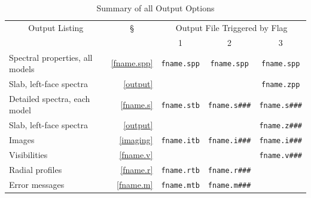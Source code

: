 \documentclass[11pt]{article}
\let\q=\qquad
\begin{document}
\begin{appendix}
\begin{table}[htbp]
\begin{center}
\caption{\hfil Summary of all Output Options}\label{Options Table}
\centerline{}
\renewcommand{\arraystretch}{1.3}
\begin{tabular}{|l|r||c|c|c|}                              \hline
 \multicolumn{1}{|c|}{Output Listing}  &
 \multicolumn{1}{c||}{\S}     &
 \multicolumn{3}{|c|}{Output File Triggered by Flag}  \\ \cline{3-5}
                  & & 1 & 2 & 3 \\ \hline
Spectral properties, all models  & \ref{fname.spp}
                                 & {\tt fname.spp}
                                 & {\tt fname.spp}
                                 & {\tt fname.spp}
                                 \\ \cline{1-2} \cline{5-5}
\q Slab, left-face spectra       & \ref{output}
                                 & & & {\tt fname.zpp}
                                 \\ \hline
Detailed spectra, each model     & \ref{fname.s}
                                 & {\tt fname.stb}
                                 & {\tt fname.s\#\#\#}
                                 & {\tt fname.s\#\#\#}
                                 \\ \cline{1-2} \cline{5-5}
\q Slab, left-face spectra       & \ref{output}
                                 & & & {\tt fname.z\#\#\#}
                                 \\ \hline
Images                           & \ref{imaging}
                                 & {\tt fname.itb}
                                 & {\tt fname.i\#\#\#}
                                 & {\tt fname.i\#\#\#}
                                 \\ \cline{1-2} \cline{5-5}
\q Visibilities                  & \ref{fname.v}
                                 &&& {\tt fname.v\#\#\#}  \\
                                 \hline
Radial profiles                  & \ref{fname.r}
                                 & {\tt fname.rtb}
                                 & {\tt fname.r\#\#\#}   &
                                 \\ \hline
Error messages                   & \ref{fname.m}
                                 & {\tt fname.mtb}
                                 & {\tt fname.m\#\#\#}   &
                                 \\ \hline
\end{tabular}
\end{center}
\end{table}



\end{appendix}
\end{document}
